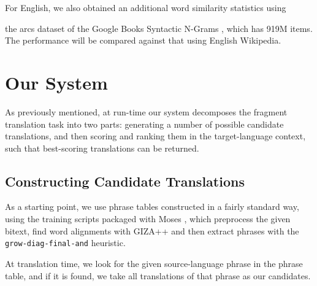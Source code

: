 \documentclass[11pt]{article}
\begin{document}
For English, we also obtained an additional word similarity statistics using

the arcs dataset of the Google Books Syntactic N-Grams \cite{goldberg:orwant:13}, which has 919M items. The performance will be compared against that using English Wikipedia. 
 

\section{Our  System}
\label{sec:system}

As previously mentioned, at run-time our system decomposes the fragment
translation task into two parts: generating a number of possible candidate
translations, and then scoring and ranking them in the target-language context,
such that best-scoring translations can be returned.

\subsection{Constructing Candidate Translations}
\label{sec:candidates}

As a starting point, we use phrase tables constructed in a fairly standard way,
using the training scripts packaged with Moses \cite{koehn:hoang:ea:07}, which
preprocess the given bitext, find word alignments with GIZA++ \cite{och:ney:00}
and then extract phrases with the \texttt{grow-diag-final-and} heuristic. 

At translation time, we look for the given source-language phrase in the phrase
table, and if it is found, we take all translations of that phrase as our
candidates.
\end{document}
